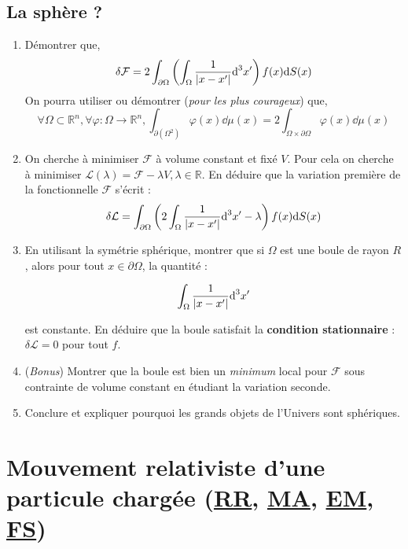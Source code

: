 \documentclass[a4paper,10pt]{report}
\newcommand{\RR}{\mathbb{R}}
\newcommand{\ddS}[1]{\text{d}S(#1)}
\begin{document}
	 	\subsection{La sphère ?}
	 	\begin{enumerate}

	 
		\item Démontrer que,
		\[
		\delta \mathcal{F} = 2 \int_{\partial \Omega} \left( \int_\Omega \frac{1}{\abs{x - x'}} \text{d}^3{x'} \right) f(x) \ddS{x}
		\]
On pourra utiliser ou démontrer (\textit{pour les plus courageux}) que, $$\forall \Omega \subset \RR^n, \forall \varphi : \Omega \to \RR^n,  \int_{\partial (\Omega^2)} \varphi(x) \dd\mu(x) = 2\int_{\Omega \times \partial \Omega} \varphi(x) \dd\mu(x)$$
		\item On cherche à minimiser $\mathcal F$ à volume constant et fixé $V$. Pour cela on cherche à minimiser $\mathcal{L}(\lambda) = \mathcal F - \lambda V, \lambda \in \RR$.
		En déduire que la variation première de la fonctionnelle \(\mathcal{F}\) s'écrit :
		\[ \delta \mathcal{L} = \int_{\partial \Omega} \left( 2 \int_{\Omega} \frac{1}{\abs{x - x'}} \text{d}^3{x'} - \lambda \right) f(x) \ddS{x} \]
		\item 	En utilisant la symétrie sphérique, montrer que si $\Omega$ est une boule de rayon $R$, alors pour tout $x \in \partial \Omega$, la quantité :
		
		\[
		\int_{\Omega} \frac{1}{\abs{x - x'}} \text{d}^3{x'}
		\]
		
		est constante. En déduire que la boule satisfait la \textbf{condition stationnaire} : $\delta \mathcal{L} = 0$ pour tout $f$.
			\item (\textit{Bonus})
		Montrer que la boule est bien un \emph{minimum} local pour $\mathcal{F}$ sous contrainte de volume constant en étudiant la variation seconde. 
		\item Conclure et expliquer pourquoi les grands objets de l'Univers sont sphériques.
	\end{enumerate}
	



\newpage \section[Mouvement relativiste d'une particule chargée $\triangle$]{Mouvement relativiste d'une particule chargée (\hyperref[subsubsec:relativite]{RR}, \hyperref[subsubsec:analytique]{MA}, \hyperref[subsubsec:maxwell]{EM}, \hyperref[subsubsec:subatomique]{FS})\space \faStar\faStar\faStar\faStar\faStar}\label{subsec:Rel_eq}
\end{document}

